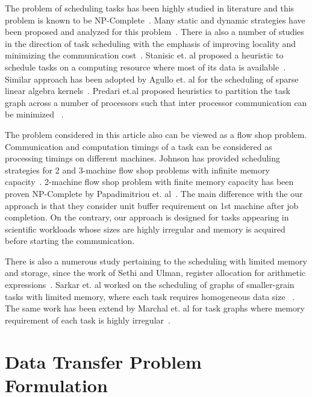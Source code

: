 \documentclass[sigconf]{acmart}
\begin{document}
	
	The problem of scheduling tasks has been highly studied in literature and this problem is known to be NP-Complete~\cite{GareyJohnson}.  Many static and dynamic strategies have been proposed and analyzed for this problem~\cite{heft-Topcuoglu,hipc16multiresource,ipdps16starpu}. There ia also a number of studies in the direction of task scheduling with the emphasis of improving locality and minimizing the communication cost~\cite{starpu,heft-Topcuoglu}. Stanisic et. al proposed a heuristic to schedule tasks on a computing resource where most of its data is available~\cite{luka-dmdar}. Similar approach has been adopted by Agullo et. al for the scheduling of sparse linear algebra kernels~\cite{agullo_fmm}.  Predari et.al  proposed  heuristics to  partition the task graph across a number of processors such that inter processor communication can be minimized ~\cite{predari:tel-01518956}.
	
	The problem considered in this article also can be viewed as a flow shop problem. Communication and computation timings of a task can be considered as processing timings on different machines.  Johnson has provided scheduling strategies for 2 and 3-machine flow shop problems with infinite memory capacity~\cite{johnson}. 2-machine flow shop problem with finite memory capacity has been proven NP-Complete by Papadimitriou et. al~\cite{Papadimitriou:1980:FSL:322203.322213}. The main difference with the our approach is that they consider unit buffer requirement on 1st machine after job completion. On the contrary, our approach is designed for tasks appearing in scientific workloads whose sizes are highly irregular and memory is acquired before starting the communication.
	
	There is also a numerous study pertaining to the scheduling with limited memory and storage, since the work of Sethi and Ulman, register allocation for arithmetic expressions~\cite{Sethi:1970:GOC:321607.321620}.  Sarkar et. al  worked on the scheduling of graphs of smaller-grain tasks with limited memory, where each task requires homogeneous data size ~\cite{vsarkar-pact}. The same work has been extend by Marchal et. al for task graphs where memory requirement of each task is highly irregular~\cite{loris-ipdps18}.
	
	
	
	\section{Data Transfer Problem Formulation}
	\label{sec:theoreticalProof}
	
\end{document}
